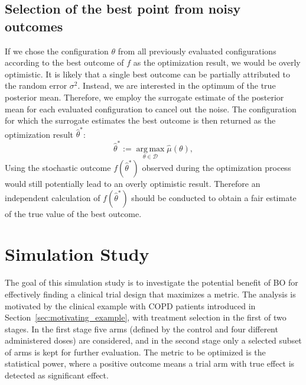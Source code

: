 \documentclass[bimj,fleqn]{w-art}
\theoremstyle{plain}
\theoremstyle{definition}
\begin{document}
\subsection{Selection of the best point from noisy outcomes}
\label{ssec:best_point}
If we chose the configuration $\theta$ from all previously evaluated configurations according to the best outcome of $f$ as the optimization result, we would be overly optimistic.
It is likely that a single best outcome can be partially attributed to the random error $\sigma^2$.
Instead, we are interested in the optimum of the true posterior mean.
Therefore, we employ the surrogate estimate of the posterior mean for each evaluated configuration to cancel out the noise.
The configuration for which the surrogate estimates the best outcome is then returned as the optimization result $\hat{\theta}^\ast$:
\begin{equation}
  \hat{\theta}^{\ast} := \operatorname{arg\,max}\limits_{\theta \in \mathcal{D}} \hat{\mu}(\theta),
\end{equation}
Using the stochastic outcome $f(\hat{\theta}^\ast) $ observed during the optimization process would still potentially lead to an overly optimistic result.
Therefore an independent calculation of $f(\hat{\theta}^\ast)$ should be conducted to obtain a fair estimate of the true value of the best outcome.

\clearpage

\section{Simulation Study}
\label{sec:simulation_study}

The goal of this simulation study is to investigate the potential benefit of BO for effectively finding a clinical trial design that maximizes a metric.
The analysis is motivated by the clinical example with COPD patients introduced in Section~\ref{sec:motivating_example}, with treatment selection in the first of two stages.
In the first stage five arms (defined by the control and four different administered doses) are considered, and in the second stage only a selected subset of arms is kept for further evaluation. 
The metric to be optimized is the statistical power, where a positive outcome means a trial arm with true effect is detected as significant effect.
\end{document}
